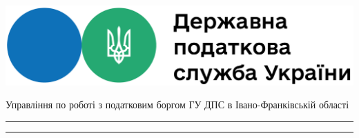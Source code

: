 \documentclass[a4paper,14pt]{article}
\begin{document}
	
	\begin{minipage}{0.45\textwidth}
	\includegraphics[scale=0.15]{Logo_DPSMain.png} 
	\end{minipage}
\hfill
\hfill
	\begin{minipage}{0.45\textwidth}
		\begin{center}
	Управління по роботі з податковим боргом ГУ ДПС в Івано-Франківській області
		\end{center}
   \end{minipage}

\bigskip

\hrule height 2pt\smallskip
\hrule height 0.5pt%
	
\end{document}
